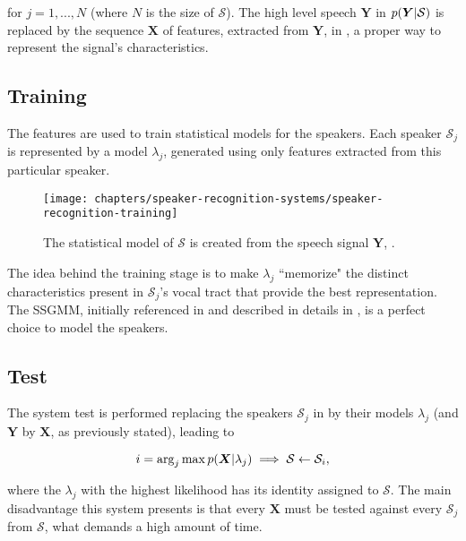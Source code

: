 \noindent for $j = 1, ..., N$ (where $N$ is the size of $\boldsymbol{\mathcal{S}}$). The high level speech $\boldsymbol{Y}$ in $p(\boldsymbol{Y}|\mathcal{S})$ is replaced by the sequence $\boldsymbol{X}$ of features, extracted from $\boldsymbol{Y}$, in , a proper way to represent the signal's characteristics.

\subsection{Training}

The features are used to train statistical models for the speakers. Each speaker $\mathcal{S}_j$ is represented by a model $\lambda_j$, generated using only features extracted from this particular speaker.

\begin{figure}[ht]
    \centering
    \texttt{[image: chapters/speaker-recognition-systems/speaker-recognition-training]}
    \caption{The statistical model of $\mathcal{S}$ is created from the speech signal $\boldsymbol{Y}$, .}
    \label{fig:speaker-recognition-training}
\end{figure}

The idea behind the training stage is to make $\lambda_j$ ``memorize" the distinct characteristics present in $\mathcal{S}_j$'s vocal tract that provide the best representation. The SSGMM, initially referenced in  and described in details in , is a perfect choice to model the speakers.

\subsection{Test}

The system test is performed replacing the speakers $\mathcal{S}_j$ in  by their models $\lambda_j$ (and $\boldsymbol{Y}$ by $\boldsymbol{X}$, as previously stated), leading to

\begin{equation}
    i = \arg_j\max\postpdf{\boldsymbol{X}}{\lambda_j} \implies \mathcal{S} \gets \mathcal{S}_i,
    \label{eq:speaker_identification}
\end{equation}

\noindent where the $\lambda_j$ with the highest likelihood has its identity assigned to $\mathcal{S}$. The main disadvantage this system presents is that every $\boldsymbol{X}$ must be tested against every $\mathcal{S}_j$ from $\boldsymbol{\mathcal{S}}$, what demands a high amount of time.

